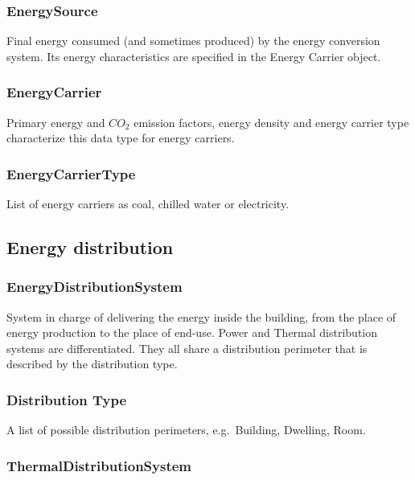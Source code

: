 \documentclass[a4paper,12pt]{article}
\begin{document}
\subsubsection{EnergySource}\label{energysource}

Final energy consumed (and sometimes produced) by the energy conversion
system. Its energy characteristics are specified in the Energy Carrier
object.

\subsubsection{EnergyCarrier}\label{energycarrier}

Primary energy and \(CO_2\) emission factors, energy density and energy
carrier type characterize this data type for energy carriers.

\subsubsection{EnergyCarrierType}\label{energycarriertype}

List of energy carriers as coal, chilled water or electricity.

\subsection{Energy distribution}\label{energy-distribution}

\subsubsection{EnergyDistributionSystem}\label{energydistributionsystem}

System in charge of delivering the energy inside the building, from the
place of energy production to the place of end-use. Power and Thermal
distribution systems are differentiated. They all share a distribution
perimeter that is described by the distribution type.

\subsubsection{Distribution Type}\label{distribution-type}

A list of possible distribution perimeters, e.g.~Building, Dwelling,
Room.

\subsubsection{ThermalDistributionSystem}\label{thermaldistributionsystem}
\end{document}
